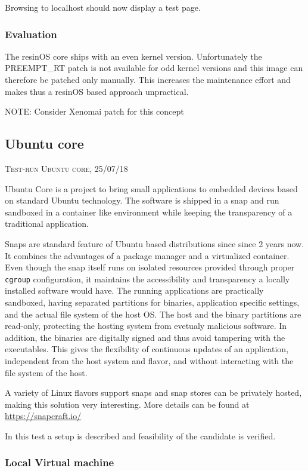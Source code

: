 \documentclass[]{scrartcl}
\begin{document}
Browsing to localhost should now display a test page.

\subsubsection{Evaluation}

The resinOS core ships with an even kernel version. Unfortunately the PREEMPT\_RT patch is not available for odd kernel versions and this image can therefore be patched only manually. This increases the maintenance effort and makes thus a resinOS based approach unpractical.

NOTE: Consider Xenomai patch for this concept

\subsection{Ubuntu core}
{\small\textsc{Test-run Ubuntu core, 25/07/18} \bigskip}

Ubuntu Core is a project to bring small applications to embedded devices based on standard Ubuntu technology. The software is shipped in a snap and run sandboxed in a container like environment while keeping the transparency of a traditional application. 

Snaps are standard feature of Ubuntu based distributions since since 2 years now. It combines the advantages of a package manager and a virtualized container. Even though the snap itself runs on isolated resources provided through proper \texttt{cgroup} configuration, it maintains the accessibility and transparency a locally installed software would have. The running applications are practically sandboxed, having separated partitions for binaries, application specific settings, and the actual file system of the host OS. The host and the binary partitions are read-only, protecting the hosting system from evetualy malicious software. In addition, the binaries are digitally signed and thus avoid tampering with the executables. This gives the flexibility of continuous updates of an application, independent from the host system and flavor, and without interacting with the file system of the host.

A variety of Linux flavors support snaps and snap stores can be privately hosted, making this solution very interesting. More details can be found at \url{https://snapcraft.io/}

In this test a setup is described and feasibility of the candidate is verified.

\subsubsection{Local Virtual machine}
\end{document}
